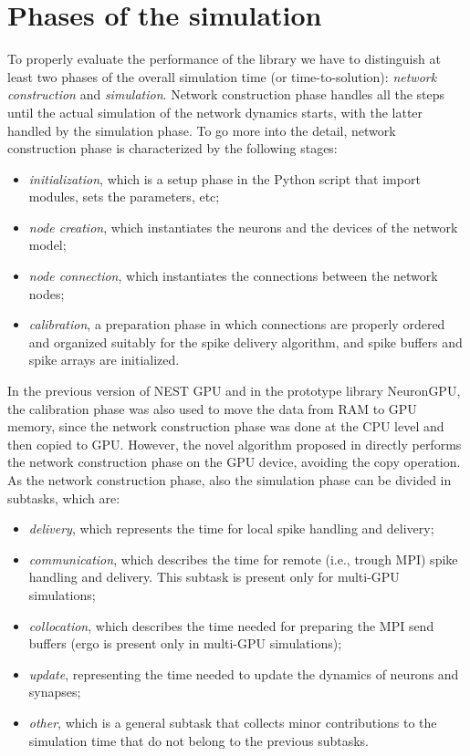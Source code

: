 \documentclass[a4paper, 12pt, twoside, openright]{book}
\begin{document}
\section{Phases of the simulation}
To properly evaluate the performance of the library we have to distinguish at least two phases of the overall simulation time (or time-to-solution): \textit{network construction} and \textit{simulation}. Network construction phase handles all the steps until the actual simulation of the network dynamics starts, with the latter handled by the simulation phase. To go more into the detail, network construction phase is characterized by the following stages:
\begin{itemize}
    \item \textit{initialization}, which is a setup phase in the Python script that import modules, sets the parameters, etc;
    \item \textit{node creation}, which instantiates the neurons and the devices of the network model;
    \item \textit{node connection}, which instantiates the connections between the network nodes;
    \item \textit{calibration}, a preparation phase in which connections are properly ordered and organized suitably for the spike delivery algorithm, and spike buffers and spike arrays are initialized.
\end{itemize}

In the previous version of NEST GPU and in the prototype library NeuronGPU, the calibration phase was also used to move the data from RAM to GPU memory, since the network construction phase was done at the CPU level and then copied to GPU. However, the novel algorithm proposed in \cite{Golosio2023} directly performs the network construction phase on the GPU device, avoiding the copy operation.\\
As the network construction phase, also the simulation phase can be divided in subtasks, which are:
\begin{itemize}
    \item \textit{delivery}, which represents the time for local spike handling and delivery;
    \item \textit{communication}, which describes the time for remote (i.e., trough MPI) spike handling and delivery. This subtask is present only for multi-GPU simulations;
    \item \textit{collocation}, which describes the time needed for preparing the MPI send buffers (ergo is present only in multi-GPU simulations);
    \item \textit{update}, representing the time needed to update the dynamics of neurons and synapses;
    \item \textit{other}, which is a general subtask that collects minor contributions to the simulation time that do not belong to the previous subtasks.
\end{itemize}
\end{document}
